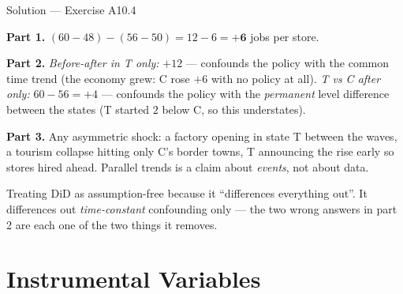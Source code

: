 \documentclass[aspectratio=169,11pt]{beamer}
\begin{document}
\begin{frame}{Solution --- Exercise A10.4}
  \begin{solutionbox}
    \footnotesize
    \textbf{Part 1.} $(60 - 48) - (56 - 50) = 12 - 6 = \mathbf{+6}$ jobs per store.
    \par\smallskip
    \textbf{Part 2.}
    \emph{Before-after in T only:} $+12$ --- confounds the policy with the common
    time trend (the economy grew: C rose $+6$ with no policy at all).
    \emph{T vs C after only:} $60 - 56 = +4$ --- confounds the policy with the
    \emph{permanent} level difference between the states (T started $2$ below C, so
    this understates).
    \par\smallskip
    \textbf{Part 3.} Any asymmetric shock: a factory opening in state T between the
    waves, a tourism collapse hitting only C's border towns, T announcing the rise
    early so stores hired ahead. Parallel trends is a claim about \emph{events},
    not about data.
  \end{solutionbox}
  \begin{mistake}
    Treating DiD as assumption-free because it ``differences everything out''. It
    differences out \emph{time-constant} confounding only --- the two wrong answers
    in part 2 are each one of the two things it removes.
  \end{mistake}
\end{frame}

\section{Instrumental Variables}
\end{document}
